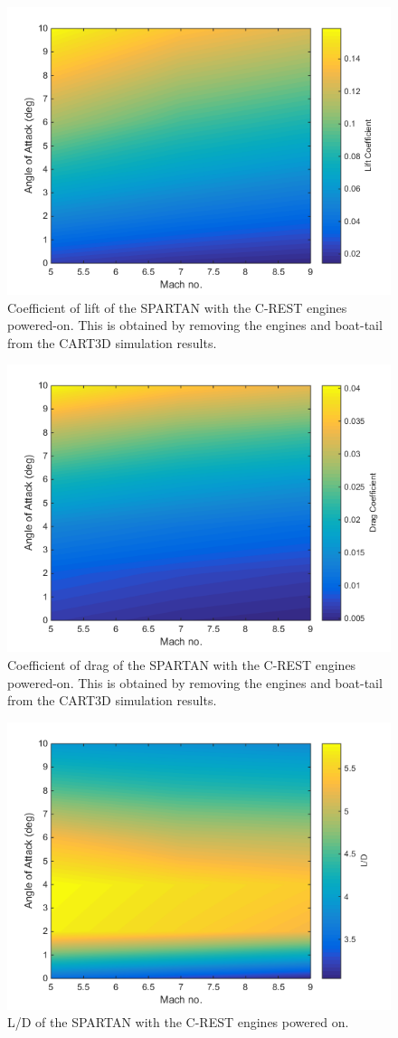 \begin{figure}
	\centering
	\includegraphics[width=0.7\linewidth]{figures/3_vehicle_design/Cl-EngineOn}
	\caption{Coefficient of lift of the SPARTAN with the C-REST engines powered-on. This is obtained by removing the engines and boat-tail from the CART3D simulation results.}
	\label{fig:Cl-EngineOn}
\end{figure}
\begin{figure}
	\centering
	\includegraphics[width=0.7\linewidth]{figures/3_vehicle_design/Cd-EngineOn}
	\caption{Coefficient of drag of the SPARTAN with the C-REST engines powered-on. This is obtained by removing the engines and boat-tail from the CART3D simulation results.}
	\label{fig:Cd-EngineOn}
\end{figure}
\begin{figure}
	\centering
	\includegraphics[width=0.7\linewidth]{figures/3_vehicle_design/LD-EngineOn}
	\caption{L/D of the SPARTAN with the C-REST engines powered on.}
	\label{fig:LD-EngineOn}
\end{figure}

